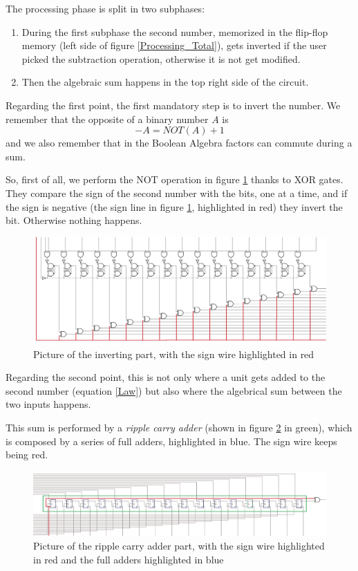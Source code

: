 \documentclass{article}
\begin{document}
The processing phase is split in two subphases:
\begin{enumerate}
  \item During the first subphase the second number, memorized in the flip-flop memory (left side of figure \ref{Processing_Total}), gets inverted if the user picked the subtraction operation, otherwise it is not get modified.
  \item Then the algebraic sum happens in the top right side of the circuit.
\end{enumerate}

Regarding the first point, the first mandatory step is to invert the number. We remember that the opposite of a binary number $A$ is
\begin{equation}
-A=NOT(A)+1
\label{Law}
\end{equation}
and we also remember that in the Boolean Algebra factors can commute during a sum.

So, first of all, we perform the NOT operation in figure \ref{Processing1} thanks to XOR gates. They compare the sign of the second number with the bits, one at a time, and if the sign is negative (the sign line in figure \ref{Processing1}, highlighted in red) they invert the bit. Otherwise nothing happens.

\begin{figure}[h]
  \centering
  \includegraphics[scale=0.35]{SC_Processing1.JPG}
  \caption{Picture of the inverting part, with the sign wire highlighted in red}
  \label{Processing1}
\end{figure}

Regarding the second point, this is not only where a unit gets added to the second number (equation \ref{Law}) but also where the algebrical sum between the two inputs happens.

This sum is performed by a \textit{ripple carry adder} (shown in figure \ref{RCA} in green), which is composed by a series of full adders, highlighted in blue. The sign wire keeps being red.

\begin{figure}[h]
  \centering
  \includegraphics[scale=0.43]{SC_Processing2.JPG}
  \caption{Picture of the ripple carry adder part, with the sign wire highlighted in red and the full adders highlighted in blue}
  \label{RCA}
\end{figure}
\end{document}
